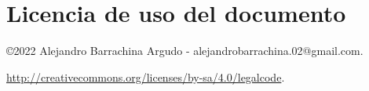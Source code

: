 \chapter*{Licencia de uso del documento}

\begin{flushright}
    \copyright  2022 Alejandro Barrachina Argudo - alejandrobarrachina.02@gmail.com.

    \doclicenseThis
 
    \url{http://creativecommons.org/licenses/by-sa/4.0/legalcode}.
\end{flushright}
